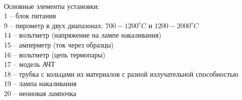 \documentclass[a4paper,12pt]{article}
\begin{document}
\paragraph{}
Основные элементы установки:\\
1 -- блок питания\\
9 -- пирометр в двух диапазонах: $700-1200 ^oC$ и $1200-2000^oC$\\
14 -- вольтметр (напряжение на лампе накаливания)\\
15 -- амперметр (ток через образцы)\\
16 -- вольтметр (цепь термопары)\\
17 -- модель АЧТ\\
18 -- трубка с кольцами из материалов с разной излучательной способностью\\
19 -- лампа накаливания\\
20 -- неоновая лампочка
\newpage
\end{document}
